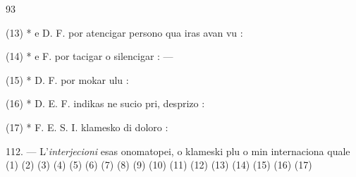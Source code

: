 \begin{VUpage}[97]{93}
{(13) * e  D. F. por atencigar persono qua iras avan vu : \nl
{}

(14) * e  F. por tacigar o silencigar : \nl
{} --- 

(15) * D. F. por mokar ulu : 

(16) * D. E. F. indikas ne sucio pri, desprizo : \nl
{}

(17) * F. E. S. I. klamesko di doloro : \nl
{}%
}

\VUsaut{1.24mm}
\VUsaut{4.24mm}

112. --- L'\textit{interjecioni} esas onomatopei, o klameski plu\nl
o min internaciona quale  (1)  (2)  (3)\nl
{} (4)  (5)  (6)  (7)  (8) \nl
{} (9)  (10)  (11)  (12)  (13)  (14)\nl
{} (15)  (16)  (17)
\end{VUpage}

